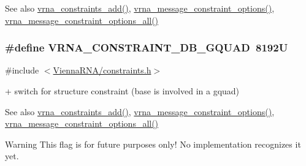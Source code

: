 \begin{DoxySeeAlso}{See also}
\hyperlink{group__constraints_ga35a401f680969a556858a8dd5f1d07cc}{vrna\+\_\+constraints\+\_\+add()}, \hyperlink{group__constraints_gaa1f20b53bf09ac2e6b0dbb13f7d89670}{vrna\+\_\+message\+\_\+constraint\+\_\+options()}, \hyperlink{group__constraints_gaec7e13fa0465c2acc7a621d1aecb709f}{vrna\+\_\+message\+\_\+constraint\+\_\+options\+\_\+all()} 
\end{DoxySeeAlso}
\hypertarget{group__constraints_ga75cfab03cdc97c95b3ce8bb29f52b08e}{}
\subsubsection[{V\+R\+N\+A\+\_\+\+C\+O\+N\+S\+T\+R\+A\+I\+N\+T\+\_\+\+D\+B\+\_\+\+G\+Q\+U\+A\+D}]{\setlength{\rightskip}{0pt plus 5cm}\#define V\+R\+N\+A\+\_\+\+C\+O\+N\+S\+T\+R\+A\+I\+N\+T\+\_\+\+D\+B\+\_\+\+G\+Q\+U\+A\+D~8192\+U}\label{group__constraints_ga75cfab03cdc97c95b3ce8bb29f52b08e}


{\ttfamily \#include $<$\hyperlink{constraints_8h}{Vienna\+R\+N\+A/constraints.\+h}$>$}



\textquotesingle{}+\textquotesingle{} switch for structure constraint (base is involved in a gquad) 

\begin{DoxySeeAlso}{See also}
\hyperlink{group__constraints_ga35a401f680969a556858a8dd5f1d07cc}{vrna\+\_\+constraints\+\_\+add()}, \hyperlink{group__constraints_gaa1f20b53bf09ac2e6b0dbb13f7d89670}{vrna\+\_\+message\+\_\+constraint\+\_\+options()}, \hyperlink{group__constraints_gaec7e13fa0465c2acc7a621d1aecb709f}{vrna\+\_\+message\+\_\+constraint\+\_\+options\+\_\+all()} 
\end{DoxySeeAlso}
\begin{DoxyWarning}{Warning}
This flag is for future purposes only! No implementation recognizes it yet. 
\end{DoxyWarning}
\hypertarget{group__constraints_ga29ebe940110d60ab798fdacbcdbbfb7d}{}
